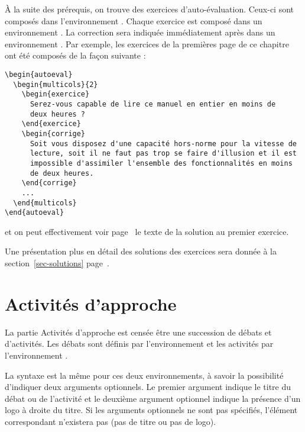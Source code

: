 \documentclass[nocrop]{sesamanuel}
\begin{document}
À la suite des prérequis, on trouve des exercices
d'auto-évaluation. Ceux-ci sont composés dans l'environnement
. Chaque exercice est composé dans un environnement
. La correction sera indiquée immédiatement après
dans un environnement . Par exemple, les exercices de
la premières page de ce chapitre ont été composés de la façon suivante :
\begin{syntaxe}
\begin{verbatim}
\begin{autoeval}
  \begin{multicols}{2}
    \begin{exercice}
      Serez-vous capable de lire ce manuel en entier en moins de
      deux heures ?
    \end{exercice}
    \begin{corrige}
      Soit vous disposez d'une capacité hors-norme pour la vitesse de
      lecture, soit il ne faut pas trop se faire d'illusion et il est
      impossible d'assimiler l'ensemble des fonctionnalités en moins
      de deux heures.
    \end{corrige}
    ...
  \end{multicols}
\end{autoeval}
\end{verbatim}
  et on peut effectivement voir page~\pageref{toutes-solutions} le texte
  de la solution au premier exercice.

  Une présentation plus en détail des solutions des exercices sera
  donnée à la section~\ref{sec-solutions}
  page~\pageref{sec-solutions}.
\end{syntaxe}

\section{Activités d'approche}
\label{sec-activites-d-approche}
La partie Activités d'approche est censée être une succession de
débats et d'activités. Les débats sont définis par l'environnement
 et les activités par l'environnement
.

La syntaxe est la même pour ces deux environnements, à savoir la
possibilité d'indiquer deux arguments optionnels. Le premier argument
indique le titre du débat ou de l'activité et le deuxième argument
optionnel indique la présence d'un logo à droite du titre. Si les
arguments optionnels ne sont pas spécifiés, l'élément correspondant
n'existera pas (pas de titre ou pas de logo).
\end{document}
